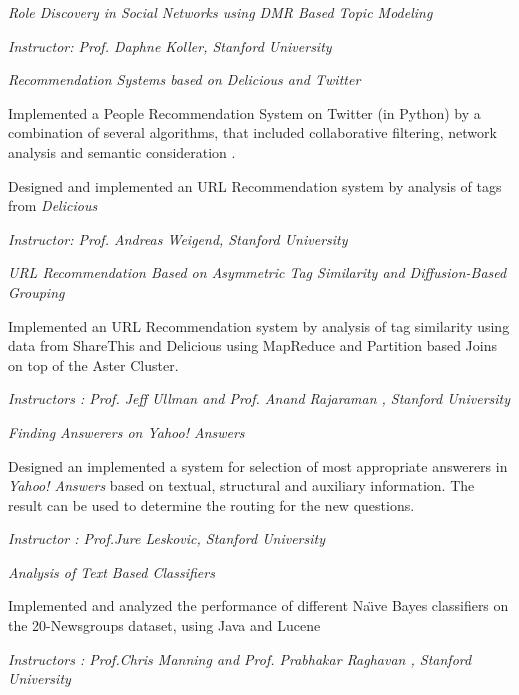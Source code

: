 \documentclass[10pt]{article}
\newcommand{\spc}{\vspace{1.2mm}}
\begin{document}
\textit{Role Discovery in Social Networks using DMR Based Topic Modeling} 
\begin{compactitem}
\item {}
\item \emph{Instructor: Prof. Daphne Koller, Stanford University}
\end{compactitem}
\spc



\textit{Recommendation Systems based on Delicious and Twitter} 
\begin{compactitem}
\item {Implemented a People Recommendation System on Twitter (in Python) by a combination of several algorithms, that included collaborative filtering, network analysis and semantic consideration .}
\item{Designed and implemented an URL Recommendation system by analysis of tags from \emph{Delicious}}
\item \emph{Instructor: Prof. Andreas Weigend, Stanford University}
\end{compactitem}
\spc
\textit{URL Recommendation Based on Asymmetric Tag Similarity and Diffusion-Based Grouping}
\begin{compactitem}
\item {Implemented an URL Recommendation system by analysis of tag similarity using data from ShareThis and Delicious using MapReduce and Partition based Joins on top of the Aster Cluster.}
\item \emph{Instructors : Prof. Jeff Ullman and Prof. Anand Rajaraman , Stanford University}
\end{compactitem}
\spc

\textit{Finding Answerers on Yahoo! Answers}
\begin{compactitem}
\item {Designed an implemented a system for selection of most appropriate answerers in \emph{Yahoo! Answers} based on textual, structural and auxiliary information. The result can be used to determine the routing for the new questions.}
\item \emph{Instructor :  Prof.Jure Leskovic, Stanford University}
\end{compactitem}
\spc

\textit{Analysis of Text Based Classifiers}
\begin{compactitem}
\item {Implemented and analyzed the performance of different Na\"{\i}ve Bayes classifiers on the 20-Newsgroups dataset, using Java and Lucene}
\item \emph{Instructors :  Prof.Chris Manning and Prof. Prabhakar Raghavan , Stanford University}
\end{compactitem}
\spc
\end{document}
